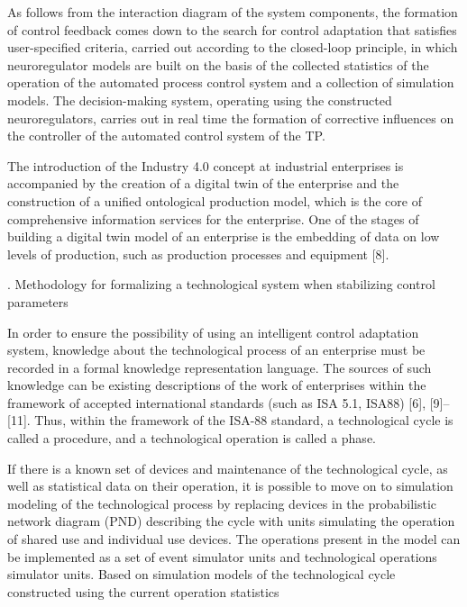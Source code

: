 \documentclass{article}
\newcommand{\RomanNumeralCaps}[1]
    {\MakeUppercase{\romannumeral #1}}
\begin{document}
\begin{multicols}{2}
As follows from the interaction diagram of the system
components, the formation of control feedback comes
down to the search for control adaptation that satisfies user-specified criteria, carried out according to the
closed-loop principle, in which neuroregulator models
are built on the basis of the collected statistics of the
operation of the automated process control system and
a collection of simulation models. The decision-making
system, operating using the constructed neuroregulators,
carries out in real time the formation of corrective
influences on the controller of the automated control
system of the TP.\par
The introduction of the Industry 4.0 concept at industrial enterprises is accompanied by the creation of
a digital twin of the enterprise and the construction
of a unified ontological production model, which is
the core of comprehensive information services for the
enterprise. One of the stages of building a digital twin
model of an enterprise is the embedding of data on low
levels of production, such as production processes and
equipment [8].
\begin{center}
\RomanNumeralCaps{4.} Methodology for formalizing a technological
system when stabilizing control parameters   
\end{center}\vspace{-8pt}\par
In order to ensure the possibility of using an intelligent
control adaptation system, knowledge about the technological process of an enterprise must be recorded in a
formal knowledge representation language. The sources
of such knowledge can be existing descriptions of the
work of enterprises within the framework of accepted
international standards (such as ISA 5.1, ISA88) [6],
[9]–[11]. Thus, within the framework of the ISA-88
standard, a technological cycle is called a procedure, and
a technological operation is called a phase.\par
If there is a known set of devices and maintenance of
the technological cycle, as well as statistical data on their
operation, it is possible to move on to simulation modeling of the technological process by replacing devices
in the probabilistic network diagram (PND) describing
the cycle with units simulating the operation of shared
use and individual use devices. The operations present
in the model can be implemented as a set of event
simulator units and technological operations simulator
units. Based on simulation models of the technological
cycle constructed using the current operation statistics

\end{multicols}
\end{document}
